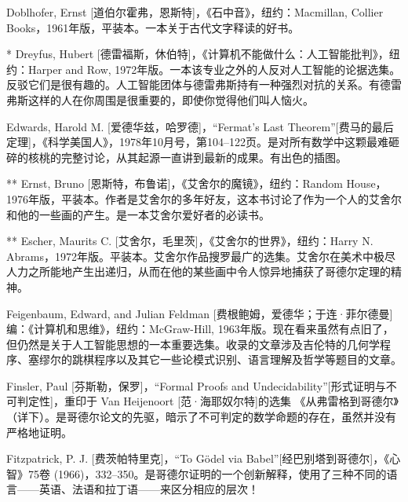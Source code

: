 \begin{thebib}
\begin{biblist}
\item Doblhofer, Ernst [道伯尔霍弗，恩斯特]，《石中音》，纽约：Macmillan, Collier Books，1961年版，平装本。一本关于古代文字释读的好书。

\item[*] Dreyfus, Hubert [德雷福斯，休伯特]，《计算机不能做什么：人工智能批判》，纽约：Harper and Row, 1972年版。一本该专业之外的人反对人工智能的论据选集。反驳它们是很有趣的。人工智能团体与德雷弗斯持有一种强烈对抗的关系。有德雷弗斯这样的人在你周围是很重要的，即使你觉得他们叫人恼火。

\item Edwards, Harold M. [爱德华兹，哈罗德]，“Fermat's Last Theorem”[费马的最后定理]，《科学美国人》，1978年10月号，第104--122页。是对所有数学中这颗最难砸碎的核桃的完整讨论，从其起源一直讲到最新的成果。有出色的插图。

\item[**] Ernst, Bruno [恩斯特，布鲁诺]，《艾舍尔的魔镜》，纽约：Random House，1976年版，平装本。作者是艾舍尔的多年好友，这本书讨论了作为一个人的艾舍尔和他的一些画的产生。是一本艾舍尔爱好者的必读书。

\item[**] Escher, Maurits C. [艾舍尔，毛里茨]，《艾舍尔的世界》，纽约：Harry N. Abrams，1972年版。平装本。艾舍尔作品搜罗最广的选集。艾舍尔在美术中极尽人力之所能地产生出递归，从而在他的某些画中令人惊异地捕获了哥德尔定理的精神。

\item Feigenbaum, Edward, and Julian Feldman [费根鲍姆，爱德华；于连·菲尔德曼]编：《计算机和思维》，纽约：McGraw-Hill, 1963年版。现在看来虽然有点旧了，但仍然是关于人工智能思想的一本重要选集。收录的文章涉及吉伦特的几何学程序、塞缪尔的跳棋程序以及其它一些论模式识别、语言理解及哲学等题目的文章。

\item Finsler, Paul [芬斯勒，保罗]，“Formal Proofs and Undecidability”[形式证明与不可判定性]，重印于 Van Heijenoort [范·海耶奴尔特]的选集 《从弗雷格到哥德尔》（详下）。是哥德尔论文的先驱，暗示了不可判定的数学命题的存在，虽然并没有严格地证明。

\item Fitzpatrick, P. J. [费茨帕特里克]，“To Gödel via Babel”[经巴别塔到哥德尔]，《心智》75卷 (1966)，332--350。是哥德尔证明的一个创新解释，使用了三种不同的语言——英语、法语和拉丁语——来区分相应的层次！


\end{biblist}
\end{thebib}
